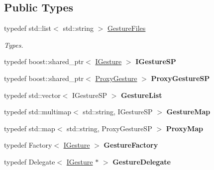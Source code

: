 \subsection*{Public Types}
\begin{DoxyCompactItemize}
\item 
\mbox{\label{class_gesture_manager_a72da7b5c9399cc34be1ec0337c447f54}} 
typedef std\+::list$<$ std\+::string $>$ \hyperlink{class_gesture_manager_a72da7b5c9399cc34be1ec0337c447f54}{Gesture\+Files}
\begin{DoxyCompactList}\small\item\em Types. \end{DoxyCompactList}\item 
\mbox{\label{class_gesture_manager_adf20e982b5dfe2f8cd9ef357211d4a2d}} 
typedef boost\+::shared\+\_\+ptr$<$ \hyperlink{class_i_gesture}{I\+Gesture} $>$ {\bfseries I\+Gesture\+SP}
\item 
\mbox{\label{class_gesture_manager_a51038e010deb91bf4df120bf34e7eee2}} 
typedef boost\+::shared\+\_\+ptr$<$ \hyperlink{class_proxy_gesture}{Proxy\+Gesture} $>$ {\bfseries Proxy\+Gesture\+SP}
\item 
\mbox{\label{class_gesture_manager_a572b1d9a614d6ed3642618efa3fc8c4c}} 
typedef std\+::vector$<$ I\+Gesture\+SP $>$ {\bfseries Gesture\+List}
\item 
\mbox{\label{class_gesture_manager_ad61019472923fab10fc3333e70cc19e4}} 
typedef std\+::multimap$<$ std\+::string, I\+Gesture\+SP $>$ {\bfseries Gesture\+Map}
\item 
\mbox{\label{class_gesture_manager_a9cdebb5ea97129019db72056043792c7}} 
typedef std\+::map$<$ std\+::string, Proxy\+Gesture\+SP $>$ {\bfseries Proxy\+Map}
\item 
\mbox{\label{class_gesture_manager_af19a0f40db6d9f52ce6f52e029f137e3}} 
typedef Factory$<$ \hyperlink{class_i_gesture}{I\+Gesture} $>$ {\bfseries Gesture\+Factory}
\item 
\mbox{\label{class_gesture_manager_a949853cf7837f7f20da2aa66ef769766}} 
typedef Delegate$<$ \hyperlink{class_i_gesture}{I\+Gesture} $\ast$ $>$ {\bfseries Gesture\+Delegate}
\end{DoxyCompactItemize}
